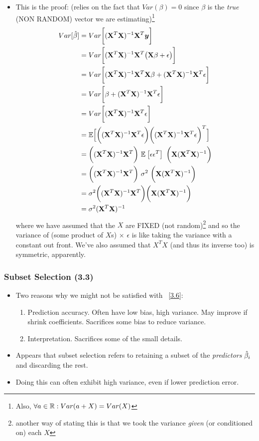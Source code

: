 \documentclass[12pt]{article}
\newcommand{\y}{\vec y}
\begin{document}
\begin{itemize}
	\item This is the proof: (relies on the fact that $Var(\beta) = 0$ since $\beta$ is the \emph{true} (NON RANDOM) vector we are estimating)\footnote{Also, $\forall a \in \mathbb{R}: Var(a + X) = Var(X)$}
	\begin{align}
		Var[\hat{\beta}] &= Var\bigg[ (\X^T \X)^{-1} \X^T \y	\bigg] \\
		&= Var\bigg[ (\X^T \X)^{-1} \X^T \big( \X \beta + \epsilon  \big)	\bigg] \\
		&= Var\bigg[ (\X^T \X)^{-1} \X^T  \X \beta +  (\X^T \X)^{-1} \X^T \epsilon  	\bigg] \\
		&= Var\bigg[ \beta +  (\X^T \X)^{-1} \X^T \epsilon  	\bigg] \\
		&= Var\bigg[ (\X^T \X)^{-1} \X^T \epsilon  	\bigg] \\
		&= \mathbb{E}\Big[	\bigg( 	(\X^T \X)^{-1} \X^T \epsilon	\bigg) \bigg(	(\X^T \X)^{-1} \X^T \epsilon \bigg)^T	\Big] \\
		&= 	\bigg( 	(\X^T \X)^{-1} \X^T  \bigg)  ~ \E{\epsilon\epsilon^T} ~ \bigg( \X 	(\X^T \X)^{-1}   \bigg)	\\
		&= 	\bigg( 	(\X^T \X)^{-1} \X^T  \bigg)  ~ \sigma^2 ~ \bigg( \X 	(\X^T \X)^{-1}   \bigg)	 \\
		&= \sigma^2	\bigg( 	(\X^T \X)^{-1} \X^T  \bigg)  \bigg( \X 	(\X^T \X)^{-1}   \bigg)	 \\
		&= \sigma^2	 	(\X^T \X)^{-1}
	\end{align}
	where we have assumed that the $X$ are FIXED (not random)\footnote{another way of stating this is that we took the variance \emph{given} (or conditioned on) each $X$} and so the variance of (some product of $X$s) $\times$ $\epsilon$ is like taking the variance with a constant out front. We've also assumed that $X^T X$ (and thus its inverse too) is symmetric, apparently. 
\end{itemize}

\subsubsection{Subset Selection (3.3)}
\begin{itemize}
	\item Two reasons why we might not be satisfied with ~\ref{3.6}:
	\begin{enumerate}
		\item Prediction accuracy. Often have low bias, high variance. May improve if shrink coefficients. Sacrifices some bias to reduce variance. 
		\item Interpretation. Sacrifices some of the small details.
	\end{enumerate}
	\item Appears that subset selection refers to retaining a subset of the \textit{predictors} $\hat{\beta}_i$ and discarding the rest.
	\item Doing this can often exhibit high variance, even if lower prediction error. 
\end{itemize}
\end{document}
